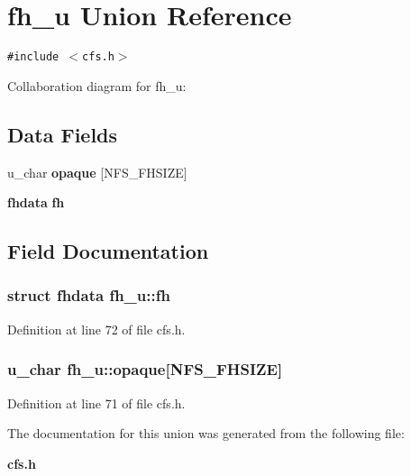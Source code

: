 \section{fh\_\-u Union Reference}
\label{unionfh__u}
{\tt \#include $<$cfs.h$>$}

Collaboration diagram for fh\_\-u:\subsection*{Data Fields}
\begin{CompactItemize}
\item 
u\_\-char {\bf opaque} [NFS\_\-FHSIZE]
\item 
{\bf fhdata} {\bf fh}
\end{CompactItemize}


\subsection{Field Documentation}
\subsubsection{\setlength{\rightskip}{0pt plus 5cm}struct {\bf fhdata} {\bf fh\_\-u::fh}}\label{unionfh__u_o1}




Definition at line 72 of file cfs.h.
\subsubsection{\setlength{\rightskip}{0pt plus 5cm}u\_\-char {\bf fh\_\-u::opaque}[NFS\_\-FHSIZE]}\label{unionfh__u_o0}




Definition at line 71 of file cfs.h.

The documentation for this union was generated from the following file:\begin{CompactItemize}
\item 
{\bf cfs.h}\end{CompactItemize}
